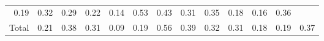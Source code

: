\begin{table}[!h]
\begin{tabular}{lllllllllllll}
  \multicolumn{1}{|r}{0.19} &
  \multicolumn{1}{r}{0.32} &
  \multicolumn{1}{r}{0.29} &
  \multicolumn{1}{r}{0.22} &
  \multicolumn{1}{r}{0.14} &
  \multicolumn{1}{r}{0.53} &
  \multicolumn{1}{r}{0.43} &
  \multicolumn{1}{r}{0.31} &
  \multicolumn{1}{r}{0.35} &
  \multicolumn{1}{r}{0.18} &
  \multicolumn{1}{r}{0.16} &
  \multicolumn{1}{r}{0.36} \\
\multicolumn{1}{l}{\hspace{1em}Total} &
  \multicolumn{1}{|r}{0.21} &
  \multicolumn{1}{r}{0.38} &
  \multicolumn{1}{r}{0.31} &
  \multicolumn{1}{r}{0.09} &
  \multicolumn{1}{r}{0.19} &
  \multicolumn{1}{r}{0.56} &
  \multicolumn{1}{r}{0.39} &
  \multicolumn{1}{r}{0.32} &
  \multicolumn{1}{r}{0.31} &
  \multicolumn{1}{r}{0.18} &
  \multicolumn{1}{r}{0.19} &
  \multicolumn{1}{r}{0.37} \\
\cline{1-13}
\end{tabular}
\end{table}
